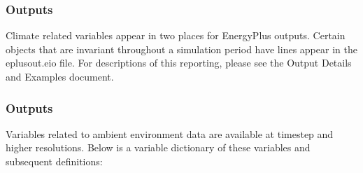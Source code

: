 \subsubsection{Outputs}\label{outputs-3-011}

Climate related variables appear in two places for EnergyPlus outputs. Certain objects that are invariant throughout a simulation period have lines appear in the eplusout.eio file. For descriptions of this reporting, please see the Output Details and Examples document.

\subsubsection{Outputs}\label{outputs-4-008}

Variables related to ambient environment data are available at timestep and higher resolutions. Below is a variable dictionary of these variables and subsequent definitions:

